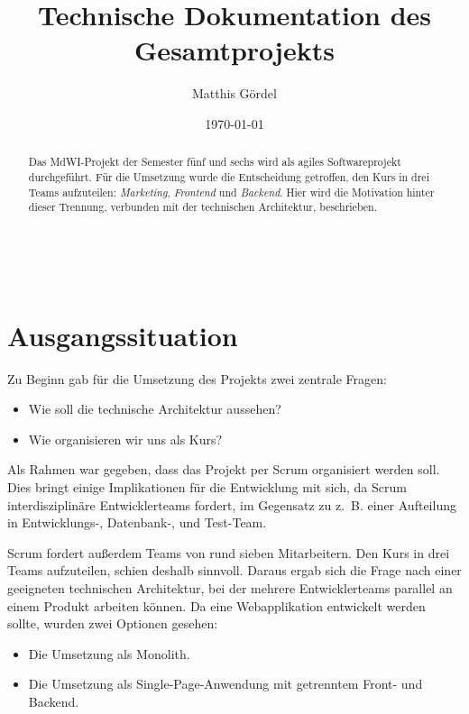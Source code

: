 \documentclass[a4paper, 11pt]{article}
\title{\textbf{Technische Dokumentation des Gesamtprojekts}}
\date{\today} %
\author{Matthis Gördel}
\makeatletter
\renewcommand{\maketitle}{ %
\begin{flushright} %
{\LARGE\@title} %

\vspace{10pt} %

{\large\@author} %
\\\@date %

\vspace{20pt} %
\end{flushright}
}
\makeatother
\begin{document}
\renewcommand{\@listI}{\itemsep=0pt} %


\maketitle %

\begin{abstract}
    Das MdWI-Projekt der Semester fünf und sechs wird als agiles
    Softwareprojekt durchgeführt. Für die Umsetzung wurde die Entscheidung
    getroffen, den Kurs in drei Teams aufzuteilen: \emph{Marketing},
    \emph{Frontend} und \emph{Backend}. Hier wird die Motivation hinter dieser
    Trennung, verbunden mit der technischen Architektur, beschrieben.
\end{abstract}

\section{Ausgangssituation}

Zu Beginn gab für die Umsetzung des Projekts zwei zentrale Fragen:

\begin{itemize}
    \item Wie soll die technische Architektur aussehen?
    \item Wie organisieren wir uns als Kurs?
\end{itemize}

Als Rahmen war gegeben, dass das Projekt per Scrum organisiert werden
soll. Dies bringt einige Implikationen für die Entwicklung mit sich, da Scrum
interdisziplinäre Entwicklerteams fordert, im Gegensatz zu z.~B. einer
Aufteilung in Entwicklungs-, Datenbank-, und Test-Team.

Scrum fordert außerdem Teams von rund sieben Mitarbeitern. Den Kurs in drei
Teams aufzuteilen, schien deshalb sinnvoll. Daraus ergab sich die Frage nach
einer geeigneten technischen Architektur, bei der mehrere Entwicklerteams
parallel an einem Produkt arbeiten können. Da eine Webapplikation entwickelt
werden sollte, wurden zwei Optionen gesehen:

\begin{itemize}
    \item Die Umsetzung als Monolith.
    \item Die Umsetzung als Single-Page-Anwendung mit getrenntem Front- und
        Backend. 
\end{itemize}
\end{document}

